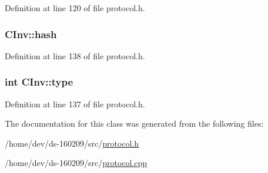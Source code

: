 Definition at line 120 of file protocol.\+h.

\hypertarget{class_c_inv_abfa04c38e9c0def9a2b09a9c43929744}{}
\subsubsection[{hash}]{ C\+Inv\+::hash}\label{class_c_inv_abfa04c38e9c0def9a2b09a9c43929744}


Definition at line 138 of file protocol.\+h.

\hypertarget{class_c_inv_a2da8a26c6b8824011e3144459d278c75}{}
\subsubsection[{type}]{\setlength{\rightskip}{0pt plus 5cm}int C\+Inv\+::type}\label{class_c_inv_a2da8a26c6b8824011e3144459d278c75}


Definition at line 137 of file protocol.\+h.



The documentation for this class was generated from the following files\+:\begin{DoxyCompactItemize}
\item 
/home/dev/ds-\/160209/src/\hyperlink{protocol_8h}{protocol.\+h}\item 
/home/dev/ds-\/160209/src/\hyperlink{protocol_8cpp}{protocol.\+cpp}\end{DoxyCompactItemize}

